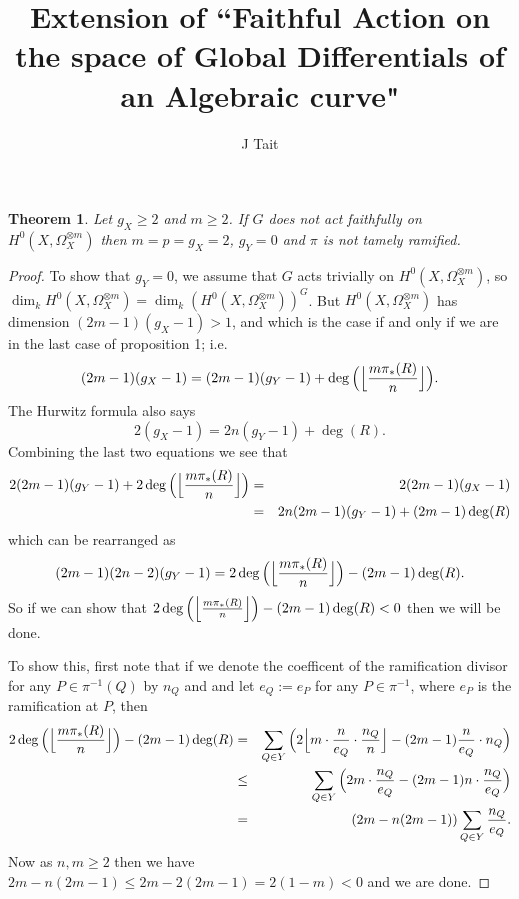 \documentclass[11pt]{article} %
\title{Extension of ``Faithful Action on the space of Global Differentials of an Algebraic curve"}
\author{J Tait}
\newtheorem{thm}{Theorem}
\begin{document}
\maketitle

\begin{thm}
Let $g_X\geq 2$ and $m\geq 2$. If $G$ does not act faithfully on $H^0(X,\Omega_X^{\otimes m})$ then $m=p=g_X=2$, $g_Y=0$ and $\pi$ is not tamely ramified.
\end{thm}
\begin{proof}
To show that $g_Y=0$, we assume that $G$ acts trivially on $H^0(X,\Omega_X^{\otimes m})$, so $\dim_kH^0(X,\Omega_X^{\otimes m})=\dim_k(H^0(X,\Omega_X^{\otimes m}))^G$. But $H^0(X,\Omega_X^{\otimes m})$ has dimension $(2m-1)(g_X-1)>1$, and which is the case if and only if we are in the last case of proposition 1; i.e.
\begin{equation*}
	(2m-1)(g_X-1)=(2m-1)(g_Y-1)+\deg\Big(\Big{\lfloor}\frac{m\pi_*(R)}{n}\Big{\rfloor}\Big).
\end{equation*}
The Hurwitz formula also says
\begin{equation*}
	2(g_X-1)=2n(g_Y-1)+\deg(R).
\end{equation*}
Combining the last two equations we see that
\begin{eqnarray*}
	2(2m-1)(g_Y-1)+2\deg\Big(\Big{\lfloor}\frac{m\pi_*(R)}{n}\Big{\rfloor}\Big) & = & 2(2m-1)(g_X-1)\\
	& = & 2n(2m-1)(g_Y-1)+(2m-1)\deg(R)
\end{eqnarray*}
which can be rearranged as
\begin{equation*}
(2m-1)(2n-2)(g_Y-1)=2\deg\Big(\Big{\lfloor}\frac{m\pi_*(R)}{n}\Big{\rfloor}\Big)-(2m-1)\deg(R).
\end{equation*}
So if we can show that $2\deg\Big(\Big{\lfloor}\frac{m\pi_*(R)}{n}\Big{\rfloor}\Big)-(2m-1)\deg(R)<0$ then we will be done.

To show this, first note that if we denote the coefficent of the ramification divisor for any $P\in \pi^{-1}(Q)$ by $n_Q$ and and let $e_Q:= e_P$ for any $P\in \pi^{-1}$, where $e_P$ is the ramification  at $P$, then
\begin{eqnarray*}
	2\deg\Big(\Big{\lfloor}\frac{m\pi_*(R)}{n}\Big{\rfloor}\Big)-(2m-1)\deg(R)&=&\sum_{Q\in Y}\Big(2\Big{\lfloor}m\cdot \frac{n}{e_Q}\cdot \frac{n_Q}{n}\Big{\rfloor}-(2m-1)\frac{n}{e_Q}\cdot n_Q\Big) \\
	&\leq & \sum_{Q\in Y}\Big(2m\cdot\frac{n_Q}{e_Q}-(2m-1)n\cdot\frac{n_Q}{e_Q}\Big) \\
	& = & (2m-n(2m-1))\sum_{Q\in Y}\frac{n_Q}{e_Q}.
\end{eqnarray*}
Now as $n,m\geq 2$ then we have $2m-n(2m-1)\leq 2m-2(2m-1)=2(1-m)<0$ and we are done.
\end{proof}





\end{document}
